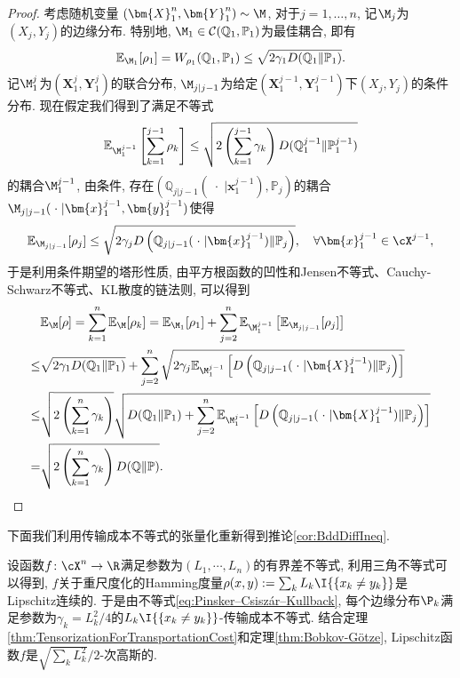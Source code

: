 \begin{proof}
	考虑随机变量 $(\bm{X}_1^n, \bm{Y}_1^n) \sim \M$, 对于$j = 1, \dots, n$, 记$\M_j$为$(X_j, Y_j)$的边缘分布. 
	特别地, $\M_1 \in \mathcal{C}(\mathbb{Q}_1, \mathbb{P}_1)$为最佳耦合, 即有
	\begin{equation*}
		\mathbb{E}_{\M_1} [\rho_1] = W_{\rho_1} (\mathbb{Q}_1, \mathbb{P}_1) \leq \sqrt{2 \gamma_1 D(\mathbb{Q}_1 \| \mathbb{P}_1)}. 
	\end{equation*}
	记$\M_1^j$为$(\bm{X}_1^j, \bm{Y}_1^j)$的联合分布, $\M_{j | j-1}$为给定$(\bm{X}_1^{j-1}, \bm{Y}_1^{j-1})$下$(X_j, Y_j)$的条件分布. 
	现在假定我们得到了满足不等式
	\begin{equation*}
		\mathbb{E}_{\M_1^{j-1}} \left[\sum_{k=1}^{j-1} \rho_k \right]
		\leq \sqrt{2 \left(\sum_{k=1}^{j-1} \gamma_k \right) D(\mathbb{Q}_1^{j-1} \| \mathbb{P}_1^{j-1})}
	\end{equation*}
	的耦合$\M_1^{j-1}$, 由条件, 存在$\left(\mathbb{Q}_{j | j-1}(\;\cdot\; | \bm{x}_1^{j-1}), \mathbb{P}_j\right)$的耦合$\M_{j | j-1}(\;\cdot\; | \bm{x}_1^{j-1}, \bm{y}_1^{j-1})$使得
	\begin{equation*}
		\mathbb{E}_{\M_{j | j-1}}[ \rho_j] 
		\leq \sqrt{2 \gamma_j D\left(\mathbb{Q}_{j | j-1}(\;\cdot\; | \bm{x}_1^{j-1}) \| \mathbb{P}_j\right)}, 
		\quad \forall \bm{x}_1^{j-1} \in \cX^{j-1}, 
	\end{equation*}
	于是利用条件期望的塔形性质, 由平方根函数的凹性和Jensen不等式、Cauchy-Schwarz不等式、KL散度的链法则, 可以得到
	\begin{align*}
		& \mathbb{E}_{\M}[\rho]
		= \sum_{k=1}^n \mathbb{E}_{\M}[ \rho_k]
		= \mathbb{E}_{\M_1}[\rho_1] + \sum_{j=2}^n \mathbb{E}_{\M_1^{j-1}} \left[ \mathbb{E}_{\M_{j | j-1}} [\rho_j] \right] \\
		\leq & \sqrt{2 \gamma_1 D(\mathbb{Q}_1 \| \mathbb{P}_1)} + \sum_{j=2}^n \sqrt{2 \gamma_j \mathbb{E}_{\M_1^{j-1}} \left[ D\left(\mathbb{Q}_{j | j-1}(\;\cdot\; | \bm{X}_1^{j-1}) \| \mathbb{P}_j\right) \right]} \\
		\leq & \sqrt{2 \left(\sum_{k=1}^n \gamma_k \right)} \sqrt{D(\mathbb{Q}_1 \| \mathbb{P}_1) + \sum_{j=2}^n \mathbb{E}_{\M_1^{j-1}} \left[ D\left(\mathbb{Q}_{j | j-1}(\;\cdot\; | \bm{X}_1^{j-1}) \| \mathbb{P}_j\right) \right]} \\
		= & \sqrt{2 \left(\sum_{k=1}^n \gamma_k \right) D(\mathbb{Q} \| \mathbb{P})}. 
	\end{align*}
\end{proof}

下面我们利用传输成本不等式的张量化重新得到推论\ref{cor:BddDiffIneq}. 
\begin{example}[有界差不等式']
	设函数$f \colon \cX^n \to \R$满足参数为$(L_1, \cdots, L_n)$的有界差不等式, 利用三角不等式可以得到, $f$关于重尺度化的Hamming度量$\rho(x, y) := \sum_k L_k \I{\{x_k \neq y_k\}}$是Lipschitz连续的. 
	于是由不等式\ref{eq:Pinsker–Csiszár–Kullback}, 每个边缘分布$\P_k$满足参数为$\gamma_k = L_k^2 / 4$的$L_k \I{\{x_k \neq y_k\}}$-传输成本不等式. 
	结合定理\ref{thm:TensorizationForTransportationCost}和定理\ref{thm:Bobkov-Götze}, Lipschitz函数$f$是$\sqrt{\sum_k L_k^2} / 2$-次高斯的. 
\end{example}


